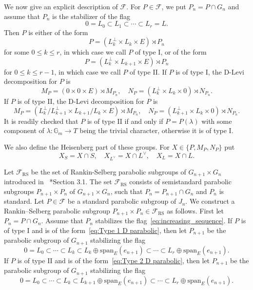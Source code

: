 \documentclass[letterpaper,11pt]{amsart}
\newcommand{\bG}{\mathbb{G}}
\newcommand{\cF}{\mathcal{F}}
\newcommand{\<}{\negthickspace}
\theoremstyle{definition}
\theoremstyle{plain}
\theoremstyle{remark}
\numberwithin{equation}{section}
\begin{document}
We now give an explicit description of $\cF$. For $P \in \cF$, we put $P_n = P
\cap G_n$ and assume that $P_n$ is the stabilizer of the flag
    \begin{equation}    \label{eq:increasing_sequence}
     0 = L_0 \subset L_1 \subset \cdots \subset L_r=L.
    \end{equation}
Then  $P$ is either of the form
    \begin{equation}    \label{eq:Type 1 D parabolic}
    P = (L_k^\perp \times L_k \times E) \rtimes P_n
    \end{equation}
for some $0 \leq k \leq r$, in which case we call $P$ of type I,  or of the form
    \begin{equation}    \label{eq:Type 2 D parabolic}
    P  = (L_k^\perp \times L_{k+1} \times E) \rtimes P_n
    \end{equation}
for $0 \le k \le r-1$, in which case we call $P$ of type II. If $P$ is of type I,
the D-Levi decomposition for $P$ is
    \[
     M_{P}  = (0 \times 0 \times E) \rtimes M_{P_n}, \quad
    N_{P}  = (L_k^\perp \times L_k \times 0) \rtimes N_{P_n}.
    \]
If $P$ is of type II, the D-Levi decomposition for $P$ is
    \[
        M_{P}
        = (L_k^\perp/L_{k+1}^{\perp} \times L_{k+1}/L_k \times E)
        \rtimes M_{P_n}, \quad
        N_{P}  = (L_{k+1}^\perp \times L_k \times 0) \rtimes N_{P_n}.
    \]
It is readily checked that $P$ is of type II if and only if $P=P(\lambda)$ with
some component of $\lambda:\bG_m \to T$ being the trivial character, otherwise
it is of type I.



We also define the Heisenberg part of these groups. For $X \in \{P,M_P,N_P\}$
put
    \[
    X_S = X \cap S, \quad
    X_{L^\vee}=X \cap L^\vee, \quad X_L= X \cap L.
    \]

Let $\cF_{\mathrm{RS}}$ be the set of Rankin-Selberg parabolic subgroups of
$G_{n+1} \times G_n$ introduced in ~\cite{BPCZ}*{Section 3.1}. The set
$\cF_\mathrm{RS}$ consists of semistandard parabolic subgroups $P_{n+1}
\times P_n$ of $G_{n+1} \times G_n$, such that $P_n = P_{n+1} \cap G_n$ and
$P_n$ is standard. Let $P \in \cF$ be a standard parabolic subgroup of $J_n$. We construct
a Rankin--Selberg parabolic subgroup $P_{n+1} \times P_n \in \cF_{\mathrm{RS}}$
as follows. First let $P_n = P \cap G_n$. Assume that $P_n$ stabilizes the
flag~\eqref{eq:increasing_sequence}. If $P$ is of type I and is of the
form~\eqref{eq:Type 1 D parabolic}, then let $P_{n+1}$ be
the parabolic subgroup of $G_{n+1}$ stabilizing the flag
    \begin{equation} \label{eq:type_1_flag}
    0=L_0 \subset \cdots \subset L_k \subset L_k
    \oplus \mathrm{span}_E(e_{n+1}) \subset \cdots \subset L_r
    \oplus \mathrm{span}_E(e_{n+1}).
    \end{equation}
If $P$ is of type II and is of the form~\eqref{eq:Type 2 D parabolic},
then let $P_{n+1}$ be the parabolic subgroup of $G_{n+1}$
stabilizing the flag
    \begin{equation} \label{eq:type_2_flag}
    0=L_0 \subset \cdots  \subset
    L_k \subset L_{k+1}\oplus \mathrm{span}_E(e_{n+1}) \subset \cdots \subset
    L_r \oplus \mathrm{span}_E(e_{n+1}).
    \end{equation}
\end{document}
